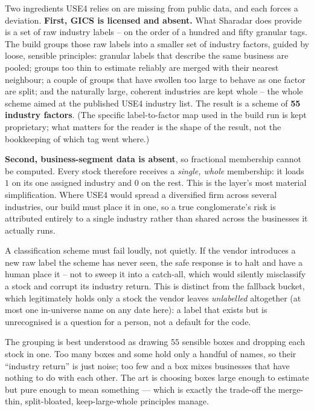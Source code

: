 \documentclass[11pt]{article}
\theoremstyle{definition}
\theoremstyle{plain}
\theoremstyle{remark}
\begin{document}
Two ingredients USE4 relies on are missing from public data, and each forces a deviation. \textbf{First, GICS is licensed and absent.} What Sharadar does provide is a set of raw industry labels -- on the order of a hundred and fifty granular tags. The build groups those raw labels into a smaller set of industry factors, guided by loose, sensible principles: granular labels that describe the same business are pooled; groups too thin to estimate reliably are merged with their nearest neighbour; a couple of groups that have swollen too large to behave as one factor are split; and the naturally large, coherent industries are kept whole -- the whole scheme aimed at the published USE4 industry list. The result is a scheme of \textbf{55 industry factors}. (The specific label-to-factor map used in the build run is kept proprietary; what matters for the reader is the shape of the result, not the bookkeeping of which tag went where.)

\textbf{Second, business-segment data is absent}, so fractional membership cannot be computed. Every stock therefore receives a \emph{single, whole} membership: it loads $1$ on its one assigned industry and $0$ on the rest. This is the layer's most material simplification. Where USE4 would spread a diversified firm across several industries, our build must place it in one, so a true conglomerate's risk is attributed entirely to a single industry rather than shared across the businesses it actually runs.

\begin{pitfall}
A classification scheme must fail loudly, not quietly. If the vendor introduces a new raw label the scheme has never seen, the safe response is to halt and have a human place it -- not to sweep it into a catch-all, which would silently misclassify a stock and corrupt its industry return. This is distinct from the fallback bucket, which legitimately holds only a stock the vendor leaves \emph{unlabelled} altogether (at most one in-universe name on any date here): a label that exists but is unrecognised is a question for a person, not a default for the code.
\end{pitfall}

\begin{intuition}
The grouping is best understood as drawing $55$ sensible boxes and dropping each stock in one. Too many boxes and some hold only a handful of names, so their ``industry return'' is just noise; too few and a box mixes businesses that have nothing to do with each other. The art is choosing boxes large enough to estimate but pure enough to mean something --- which is exactly the trade-off the merge-thin, split-bloated, keep-large-whole principles manage.
\end{intuition}
\end{document}
